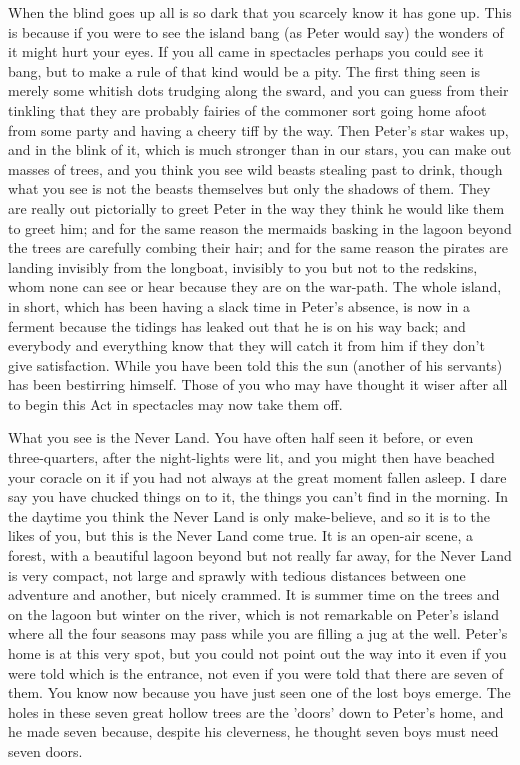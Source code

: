 

\begin{stagedir}

When the blind goes up all is so dark that you scarcely know it has gone up.
This is because if you were to see the island bang
(as Peter would say)
the wonders of it might hurt your eyes.
If you all came in spectacles perhaps you could see it bang,
but to make a rule of that kind would be a pity.
The first thing seen is merely some whitish dots trudging along the sward,
and you can guess from their tinkling that they are probably fairies of the commoner sort
going home afoot from some party and having a cheery tiff by the way.
Then Peter's star wakes up,
and in the blink of it, which is much stronger than in our stars, you can make out masses of trees,
and you think you see wild beasts stealing past to drink,
though what you see is not the beasts themselves but only the shadows of them.
They are really out pictorially to greet Peter in the way they think he would like them to greet him;
and for the same reason the mermaids basking in the lagoon beyond the trees are carefully combing their hair;
and for the same reason the pirates are landing invisibly from the longboat,
invisibly to you but not to the redskins, whom none can see or hear because they are on the war-path.
The whole island, in short, which has been having a slack time in Peter's absence,
is now in a ferment because the tidings has leaked out that he is on his way back;
and everybody and everything know that they will catch it from him if they don't give satisfaction.
While you have been told this the sun
(another of his servants)
has been bestirring himself.
Those of you who may have thought it wiser after all to begin this Act in spectacles may now take them off.

What you see is the Never Land.
You have often half seen it before, or even three-quarters, after the night-lights were lit,
and you might then have beached your coracle on it if you had not always at the great moment fallen asleep.
I dare say you have chucked things on to it, the things you can't find in the morning.
In the daytime you think the Never Land is only make-believe, and so it is to the likes of you,
but this is the Never Land come true.
It is an open-air scene, a forest,
with a beautiful lagoon beyond but not really far away, for the Never Land is very compact,
not large and sprawly with tedious distances between one adventure and another, but nicely crammed.
It is summer time on the trees and on the lagoon but winter on the river,
which is not remarkable on Peter's island where all the four seasons may pass while you are filling a jug at the well.
Peter's home is at this very spot,
but you could not point out the way into it even if you were told which is the entrance,
not even if you were told that there are seven of them.
You know now because you have just seen one of the lost boys emerge.
The holes in these seven great hollow trees are the 'doors' down to Peter's home,
and he made seven because, despite his cleverness, he thought seven boys must need seven doors.


\end{stagedir}
